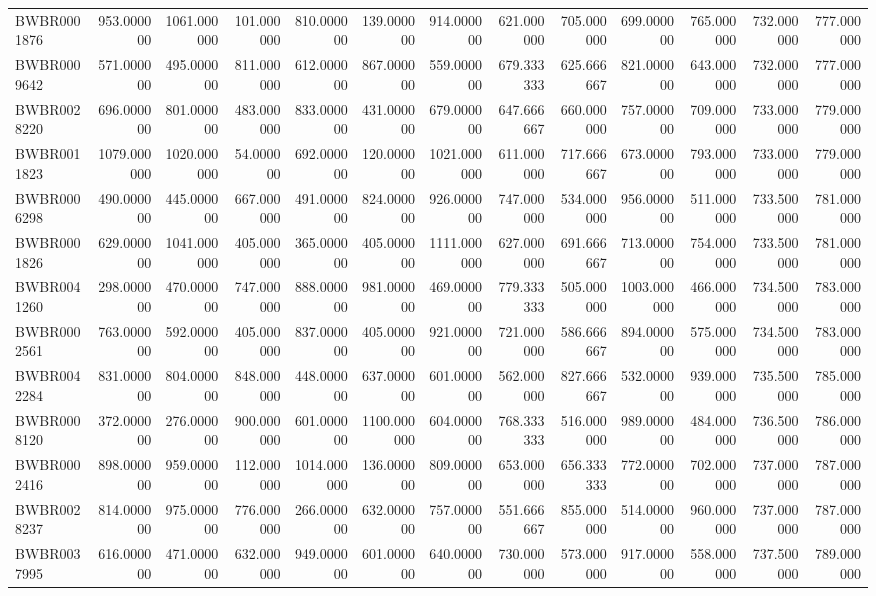 \begin{longtable}{lrrrrrrrrrrrr}
BWBR0001876 & 953.000000 & 1061.000000 & 101.000000 & 810.000000 & 139.000000 & 914.000000 & 621.000000 & 705.000000 & 699.000000 & 765.000000 & 732.000000 & 777.000000 \\
BWBR0009642 & 571.000000 & 495.000000 & 811.000000 & 612.000000 & 867.000000 & 559.000000 & 679.333333 & 625.666667 & 821.000000 & 643.000000 & 732.000000 & 777.000000 \\
BWBR0028220 & 696.000000 & 801.000000 & 483.000000 & 833.000000 & 431.000000 & 679.000000 & 647.666667 & 660.000000 & 757.000000 & 709.000000 & 733.000000 & 779.000000 \\
BWBR0011823 & 1079.000000 & 1020.000000 & 54.000000 & 692.000000 & 120.000000 & 1021.000000 & 611.000000 & 717.666667 & 673.000000 & 793.000000 & 733.000000 & 779.000000 \\
BWBR0006298 & 490.000000 & 445.000000 & 667.000000 & 491.000000 & 824.000000 & 926.000000 & 747.000000 & 534.000000 & 956.000000 & 511.000000 & 733.500000 & 781.000000 \\
BWBR0001826 & 629.000000 & 1041.000000 & 405.000000 & 365.000000 & 405.000000 & 1111.000000 & 627.000000 & 691.666667 & 713.000000 & 754.000000 & 733.500000 & 781.000000 \\
BWBR0041260 & 298.000000 & 470.000000 & 747.000000 & 888.000000 & 981.000000 & 469.000000 & 779.333333 & 505.000000 & 1003.000000 & 466.000000 & 734.500000 & 783.000000 \\
BWBR0002561 & 763.000000 & 592.000000 & 405.000000 & 837.000000 & 405.000000 & 921.000000 & 721.000000 & 586.666667 & 894.000000 & 575.000000 & 734.500000 & 783.000000 \\
BWBR0042284 & 831.000000 & 804.000000 & 848.000000 & 448.000000 & 637.000000 & 601.000000 & 562.000000 & 827.666667 & 532.000000 & 939.000000 & 735.500000 & 785.000000 \\
BWBR0008120 & 372.000000 & 276.000000 & 900.000000 & 601.000000 & 1100.000000 & 604.000000 & 768.333333 & 516.000000 & 989.000000 & 484.000000 & 736.500000 & 786.000000 \\
BWBR0002416 & 898.000000 & 959.000000 & 112.000000 & 1014.000000 & 136.000000 & 809.000000 & 653.000000 & 656.333333 & 772.000000 & 702.000000 & 737.000000 & 787.000000 \\
BWBR0028237 & 814.000000 & 975.000000 & 776.000000 & 266.000000 & 632.000000 & 757.000000 & 551.666667 & 855.000000 & 514.000000 & 960.000000 & 737.000000 & 787.000000 \\
BWBR0037995 & 616.000000 & 471.000000 & 632.000000 & 949.000000 & 601.000000 & 640.000000 & 730.000000 & 573.000000 & 917.000000 & 558.000000 & 737.500000 & 789.000000 \\

\end{longtable}
